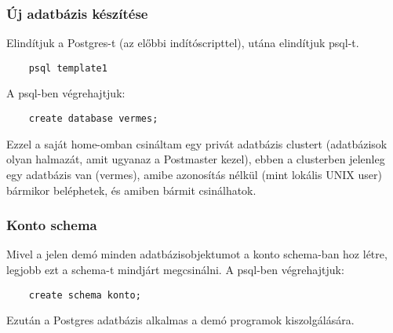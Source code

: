 \subsubsection*{Új adatbázis készítése}

Elindítjuk a Postgres-t (az előbbi indítóscripttel),
utána elindítjuk psql-t.
\begin{verbatim}
    psql template1
\end{verbatim}

A psql-ben végrehajtjuk:
\begin{verbatim}
    create database vermes;
\end{verbatim}

Ezzel a saját home-omban csináltam egy privát
adatbázis clustert (adatbázisok olyan halmazát,
amit ugyanaz a Postmaster kezel), ebben a clusterben
jelenleg egy adatbázis van (vermes), amibe azonosítás
nélkül (mint lokális UNIX user) bármikor beléphetek,
és amiben bármit csinálhatok.

\subsubsection*{Konto schema}

Mivel a jelen demó minden adatbázisobjektumot
a konto schema-ban hoz létre, legjobb ezt a schema-t mindjárt
megcsinálni. A psql-ben végrehajtjuk:
\begin{verbatim}
    create schema konto;
\end{verbatim}

Ezután a Postgres adatbázis alkalmas a demó programok kiszolgálására.


